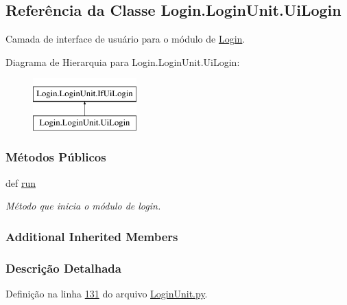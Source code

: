 \hypertarget{classLogin_1_1LoginUnit_1_1UiLogin}{\subsection{Referência da Classe Login.\-Login\-Unit.\-Ui\-Login}
\label{classLogin_1_1LoginUnit_1_1UiLogin}
}


Camada de interface de usuário para o módulo de \hyperlink{namespaceLogin}{Login}.  


Diagrama de Hierarquia para Login.\-Login\-Unit.\-Ui\-Login\-:\begin{figure}[H]
\begin{center}
\leavevmode
\includegraphics[height=2.000000cm]{de/da8/classLogin_1_1LoginUnit_1_1UiLogin}
\end{center}
\end{figure}
\subsubsection*{Métodos Públicos}
\begin{DoxyCompactItemize}
\item 
def \hyperlink{classLogin_1_1LoginUnit_1_1UiLogin_a9cd61a78d5ab0d201051ccf5898f86bc}{run}
\begin{DoxyCompactList}\small\item\em Método que inicia o módulo de login. \end{DoxyCompactList}\end{DoxyCompactItemize}
\subsubsection*{Additional Inherited Members}


\subsubsection{Descrição Detalhada}


Definição na linha \hyperlink{LoginUnit_8py_source_l00131}{131} do arquivo \hyperlink{LoginUnit_8py_source}{Login\-Unit.\-py}.



